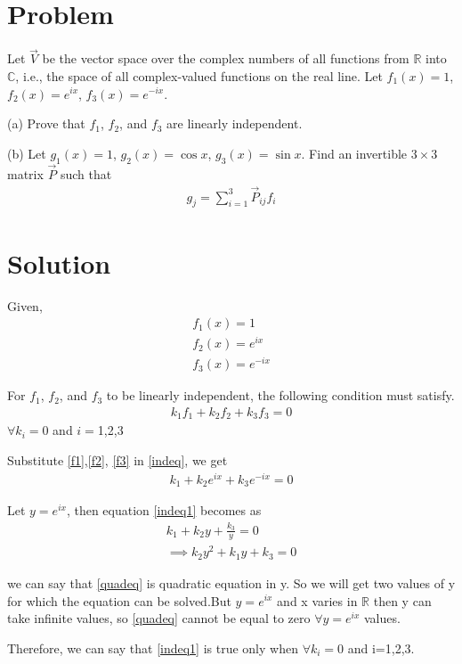 \documentclass[journal,12pt,twocolumn]{IEEEtran}
\begin{document}
\section{Problem}
Let $\vec{V}$ be the vector space over the complex numbers of all functions from $\mathbb{R}$ into $\mathbb{C}$, i.e., the space of all complex-valued functions on the real line. Let $f_1(x)=1$, $f_2(x)=e^{ix}$, $f_3(x)=e^{-ix}$.

(a) Prove that $f_1$, $f_2$, and $f_3$ are linearly independent.

(b) Let $g_1(x)=1$, $g_2(x)=\cos{x}$, $g_3(x)=\sin{x}$. Find an invertible $3\times3$ matrix $\vec{P}$ such that
\begin{align}
    g_j=\sum\limits_{i=1}^3 \vec{P}_{ij}f_i\label{eq}
\end{align}
\section{Solution}
Given,
\begin{align}
    f_1(x)=1\label{f1}\\
    f_2(x)=e^{ix}\label{f2}\\
    f_3(x)=e^{-ix}\label{f3}
\end{align}

For $f_1$, $f_2$, and $f_3$ to be linearly independent, the following condition must satisfy.
\begin{align}
    k_1f_1+k_2f_2+k_3f_3=0\label{indeq}
\end{align}
$\forall k_i=0$ and $i=$1,2,3

Substitute \eqref{f1},\eqref{f2}, \eqref{f3} in \eqref{indeq}, we get
\begin{align}
    k_1+k_2e^{ix}+k_3e^{-ix}=0\label{indeq1}
\end{align}

Let $y=e^{ix}$, then equation \eqref{indeq1} becomes as
\begin{align}
    k_1+k_2y+\frac{k_3}{y}=0\\
    \implies k_2y^2+k_1y+k_3=0\label{quadeq}
\end{align}

we can say that \eqref{quadeq} is quadratic equation in y. So we will get two values of y for which the equation can be solved.But $y=e^{ix}$ and x varies in $\mathbb{R}$ then y can take infinite values, so \eqref{quadeq} cannot be equal to zero $\forall y=e^{ix}$ values. 

Therefore, we can say that \eqref{indeq1} is true only when $\forall k_i=0$ and i=1,2,3.
\end{document}
